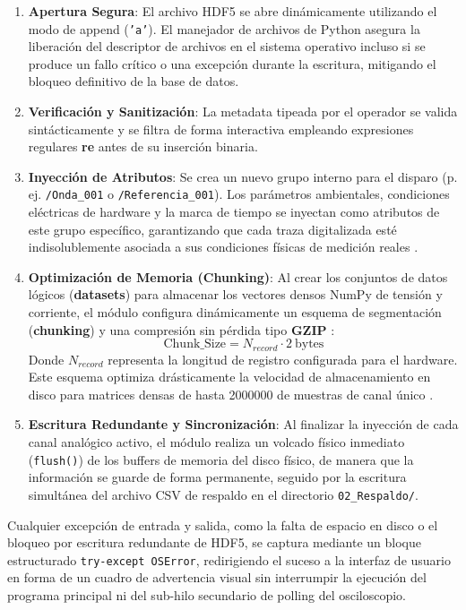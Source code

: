 \begin{enumerate}
    \item \textbf{Apertura Segura}: El archivo HDF5 se abre dinámicamente utilizando el modo de append (\texttt{'a'}). El manejador de archivos de Python asegura la liberación del descriptor de archivos en el sistema operativo incluso si se produce un fallo crítico o una excepción durante la escritura, mitigando el bloqueo definitivo de la base de datos.
    \item \textbf{Verificación y Sanitización}: La metadata tipeada por el operador se valida sintácticamente y se filtra de forma interactiva empleando expresiones regulares \textbf{re} antes de su inserción binaria.
    \item \textbf{Inyección de Atributos}: Se crea un nuevo grupo interno para el disparo (p. ej. \texttt{/Onda\_001} o \texttt{/Referencia\_001}). Los parámetros ambientales, condiciones eléctricas de hardware y la marca de tiempo se inyectan como atributos de este grupo específico, garantizando que cada traza digitalizada esté indisolublemente asociada a sus condiciones físicas de medición reales \cite{iec60060_1}.
    \item \textbf{Optimización de Memoria (Chunking)}: Al crear los conjuntos de datos lógicos (\textbf{datasets}) para almacenar los vectores densos NumPy de tensión y corriente, el módulo configura dinámicamente un esquema de segmentación (\textbf{chunking}) y una compresión sin pérdida tipo \textbf{GZIP} \cite{file_manager_txt}:
    \begin{equation}
    \label{eq:chunk_size}
    \text{Chunk\_Size} = N_{record} \cdot \qty{2}{\text{bytes}}
    \end{equation}
    Donde $N_{record}$ representa la longitud de registro configurada para el hardware. Este esquema optimiza drásticamente la velocidad de almacenamiento en disco para matrices densas de hasta \num{2000000} de muestras de canal único \cite{gds1000au_Spec}.
    \item \textbf{Escritura Redundante y Sincronización}: Al finalizar la inyección de cada canal analógico activo, el módulo realiza un volcado físico inmediato (\texttt{flush()}) de los buffers de memoria del disco físico, de manera que la información se guarde de forma permanente, seguido por la escritura simultánea del archivo CSV de respaldo en el directorio \texttt{02\_Respaldo/}.
\end{enumerate}

Cualquier excepción de entrada y salida, como la falta de espacio en disco o el bloqueo por escritura redundante de HDF5, se captura mediante un bloque estructurado \texttt{try-except OSError}, redirigiendo el suceso a la interfaz de usuario en forma de un cuadro de advertencia visual sin interrumpir la ejecución del programa principal ni del sub-hilo secundario de polling del osciloscopio.


